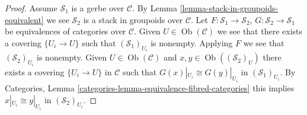 \documentclass{stacks-project}
\theoremstyle{plain}
\theoremstyle{definition}
\theoremstyle{remark}
\numberwithin{equation}{subsection}
\def\Ob{\mathop{\mathrm{Ob}}\nolimits}
\begin{document}
\begin{proof}
Assume $\mathcal{S}_1$ is a gerbe over $\mathcal{C}$. By
Lemma \ref{lemma-stack-in-groupoids-equivalent}
we see $\mathcal{S}_2$ is a stack in groupoids over $\mathcal{C}$.
Let $F : \mathcal{S}_1 \to \mathcal{S}_2$,
$G : \mathcal{S}_2 \to \mathcal{S}_1$ be equivalences of categories over
$\mathcal{C}$. Given $U \in \Ob(\mathcal{C})$ we see that there exists
a covering $\{U_i \to U\}$ such that $(\mathcal{S}_1)_{U_i}$ is
nonempty. Applying $F$ we see that $(\mathcal{S}_2)_{U_i}$ is nonempty.
Given $U \in \Ob(\mathcal{C})$ and
$x, y \in \Ob((\mathcal{S}_2)_U)$ there exists
a covering $\{U_i \to U\}$ in $\mathcal{C}$ such that
$G(x)|_{U_i} \cong G(y)|_{U_i}$ in $(\mathcal{S}_1)_{U_i}$. By
Categories, Lemma \ref{categories-lemma-equivalence-fibred-categories}
this implies $x|_{U_i} \cong y|_{U_i}$ in $(\mathcal{S}_2)_{U_i}$.
\end{proof}
\end{document}
